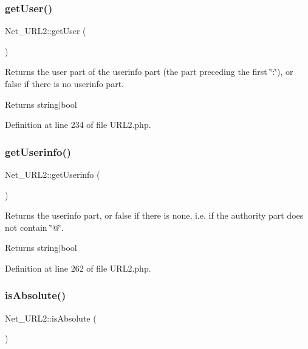 \subsubsection{\texorpdfstring{get\+User()}{getUser()}}
{\footnotesize\ttfamily Net\+\_\+\+U\+R\+L2\+::get\+User (\begin{DoxyParamCaption}{ }\end{DoxyParamCaption})}

Returns the user part of the userinfo part (the part preceding the first \char`\"{}\+:\char`\"{}), or false if there is no userinfo part.

\begin{DoxyReturn}{Returns}
string$\vert$bool 
\end{DoxyReturn}


Definition at line 234 of file U\+R\+L2.\+php.

\mbox{\label{classNet__URL2_a9249aba1b6b07ac8f992033cc865a455}} 
\subsubsection{\texorpdfstring{get\+Userinfo()}{getUserinfo()}}
{\footnotesize\ttfamily Net\+\_\+\+U\+R\+L2\+::get\+Userinfo (\begin{DoxyParamCaption}{ }\end{DoxyParamCaption})}

Returns the userinfo part, or false if there is none, i.\+e. if the authority part does not contain \char`\"{}@\char`\"{}.

\begin{DoxyReturn}{Returns}
string$\vert$bool 
\end{DoxyReturn}


Definition at line 262 of file U\+R\+L2.\+php.

\mbox{\label{classNet__URL2_adfb0cbaed0f947990271d8df410854e2}} 
\subsubsection{\texorpdfstring{is\+Absolute()}{isAbsolute()}}
{\footnotesize\ttfamily Net\+\_\+\+U\+R\+L2\+::is\+Absolute (\begin{DoxyParamCaption}{ }\end{DoxyParamCaption})}


